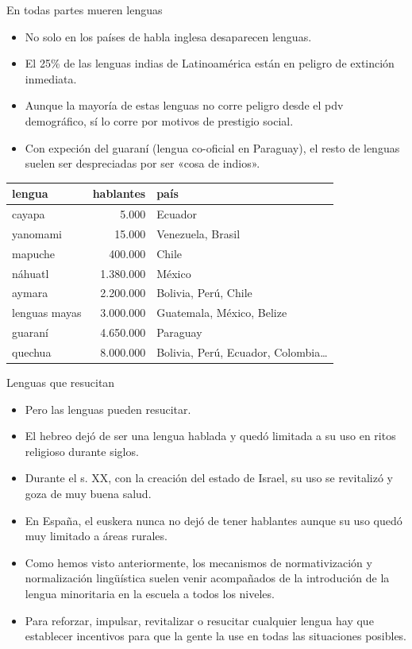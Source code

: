 \documentclass[handout]{beamer}
\begin{document}
\begin{frame}{En todas partes mueren lenguas}

\begin{itemize}
	\item No solo en los países de habla inglesa desaparecen lenguas.
	\item El 25\% de las lenguas indias de Latinoamérica están en peligro de extinción inmediata.
	\item Aunque la mayoría de estas lenguas no corre peligro desde el pdv demográfico, sí lo corre por motivos de prestigio social. 
	\item Con expeción del guaraní (lengua co-oficial en Paraguay), el resto de lenguas suelen ser despreciadas por ser «cosa de indios».
\end{itemize}
\begin{center}
\begin{footnotesize}
\begin{tabular}{ l r l }
\textbf{lengua} & \textbf{hablantes} & \textbf{país} \\
\hline
cayapa & 5.000 & Ecuador\\
yanomami & 15.000 & Venezuela, Brasil \\
mapuche & 400.000 & Chile\\
náhuatl & 1.380.000 & México \\
aymara & 2.200.000 & Bolivia, Perú, Chile\\
lenguas mayas & 3.000.000 & Guatemala, México, Belize \\
guaraní & 4.650.000 & Paraguay \\
quechua & 8.000.000 & Bolivia, Perú, Ecuador, Colombia\ldots \\
\end{tabular}
\end{footnotesize}
\end{center}

\end{frame}

\begin{frame}{Lenguas que resucitan}
\begin{itemize}
	\item Pero las lenguas pueden resucitar.
	\item El hebreo dejó de ser una lengua hablada y quedó limitada a su uso en ritos religioso durante siglos. 
	\item Durante el s. XX, con la creación del estado de Israel, su uso se revitalizó y goza de muy buena salud.
	\item En España, el euskera nunca no dejó de tener hablantes aunque su uso quedó muy limitado a áreas rurales. 
	\item Como hemos visto anteriormente, los mecanismos de normativización y normalización lingüística suelen venir acompañados de la introdución de la lengua minoritaria en la escuela a todos los niveles.
	\item Para reforzar, impulsar, revitalizar o resucitar cualquier lengua hay que establecer incentivos para que la gente la use en todas las situaciones posibles.
\end{itemize}
\end{frame}
\end{document}
